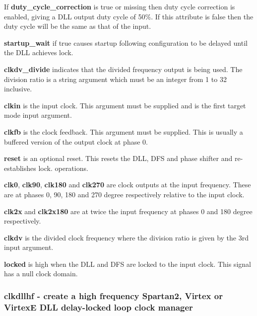                 If {\bf duty\_cycle\_correction} is true or missing then duty cycle
                correction is enabled, giving a DLL output duty cycle of 50\%. If
                this attribute is false then the duty cycle will be the same as that
                of the input.

                {\bf startup\_wait} if true causes startup following configuration to
                be delayed until the DLL achieves lock.

                {\bf clkdv\_divide} indicates that the divided
                frequency output is being used. The division ratio is a
                string argument which must be an integer from 1 to 32 inclusive.


                {\bf clkin} is the input clock. This argument must be
                supplied and is the first target mode input argument.

                {\bf clkfb} is the clock feedback. This argument must be
                supplied. This is usually a buffered version of the output clock at
                phase 0.

                {\bf reset} is an optional reset. This resets the
                DLL, DFS and phase shifter and re-establishes lock.
                operations.


                {\bf clk0}, {\bf clk90}, {\bf clk180} and {\bf clk270} are clock
                outputs at the input frequency. These are at phases 0, 90, 180 and 270
                degree respectively relative to the input clock.

                {\bf clk2x} and {\bf clk2x180} are at twice the input frequency
                at phases 0 and 180 degree respectively.

                {\bf clkdv} is the divided clock frequency where the division ratio
                is given by the 3rd input argument.

                {\bf locked} is high when the DLL and DFS are locked to the input
                clock. This signal has a null clock domain.






        \subsubsection{clkdllhf - create a high frequency Spartan2, Virtex or VirtexE DLL delay-locked loop clock manager}\label{sec:lpclkdllhf}
            
